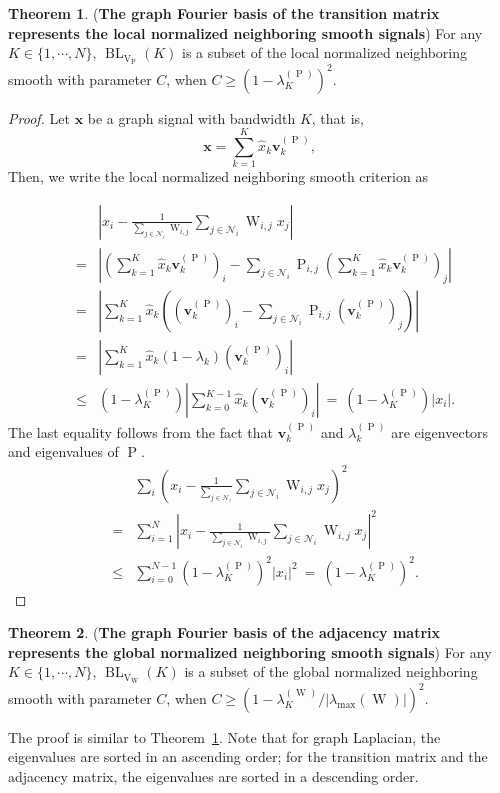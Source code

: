 \documentclass[journal,twocolumn,10pt]{IEEEtran}
\theoremstyle{definition}
\newtheorem{myThm}{Theorem}
\def\x{\mathbf{x}}
\def\vv{\mathbf{v}}
\DeclareMathOperator{\BL}{BL}
\DeclareMathOperator{\Pj}{P}
\DeclareMathOperator{\Vm}{V}
\DeclareMathOperator{\W}{W}
\begin{document}
\begin{myThm}({\bf The graph Fourier basis of the transition matrix represents the local normalized neighboring smooth signals})
\label{thm:LNNS}
For any $K \in \{1, \cdots, N \}$, $\BL_{\Vm_{\Pj}}(K)$ is a subset of the local normalized neighboring smooth with parameter $C$, when $C \geq  (1 - \lambda^{(\Pj)}_{K})^2$.
\end{myThm}
\begin{proof}
Let $\x$ be a graph signal with bandwidth $K$, that is,
$$
\x = \sum_{k=1}^{K} \widehat{x}_k \vv^{(\Pj)}_k,
$$
Then, we write the local normalized neighboring smooth criterion as

\begin{eqnarray*}
&& \left| x_i - \frac{1}{\sum_{j \in \mathcal{N}_i} \W_{i,j} }  \sum_{j \in \mathcal{N}_i} \W_{i,j} x_j  \right|
\\
&= &   \left| \left(\sum_{k=1}^{K} \widehat{x}_k \vv^{(\Pj)}_k \right)_i - \sum_{j  \in \mathcal{N}_i} \Pj_{i,j} \left(\sum_{k=1}^{K} \widehat{x}_k \vv^{(\Pj)}_k \right)_j \right|
\\
& = &   \left| \sum_{k=1}^{K} \widehat{x}_k \left(  (\vv^{(\Pj)}_k)_i - \sum_{j \in \mathcal{N}_i} \Pj_{i,j} (\vv^{(\Pj)}_k)_j \right) \right|
\\
& = &   \left| \sum_{k=1}^{K} \widehat{x}_k  (1 - \lambda_k)  (\vv^{(\Pj)}_k)_i \right|
\\
& \leq &  (1 - \lambda^{(\Pj)}_{K})  \left| \sum_{k=0}^{K-1} \widehat{x}_k  (\vv^{(\Pj)}_k)_i  \right| \ = \  (1 - \lambda^{(\Pj)}_{K})  |x_i|.
\end{eqnarray*}
The last equality follows from the fact that $\vv^{(\Pj)}_k$ and $\lambda^{(\Pj)}_k$ are eigenvectors and eigenvalues of $\Pj$.
\begin{eqnarray*}
&& \sum_i \left(  x_i -  \frac{1}{\sum_{j  \in \mathcal{N}_i }}  \sum_{j  \in \mathcal{N}_i } \W_{i,j} x_j  \right)^2 
\\
& = & \sum_{i=1}^{N} |x_i - \frac{1}{\sum_{j \in \mathcal{N}_i} \W_{i,j} }  \sum_{j \in \mathcal{N}_i} \W_{i,j} x_j |^2
\\
& \leq & \sum_{i=0}^{N-1}   (1 - \lambda^{(\Pj)}_{K} )^2  |x_i|^2 \ = \   (1 - \lambda^{(\Pj)}_{K})^2 .
\end{eqnarray*}
\end{proof}

\begin{myThm} ({\bf The graph Fourier basis of the adjacency matrix represents the global normalized neighboring smooth signals})
\label{thm:GNNS}
For any $K \in \{1, \cdots, N \}$, $\BL_{\Vm_{\W}}(K)$ is a subset of the global normalized neighboring smooth with parameter $C$, when $C \geq  (1 - \lambda^{(\W)}_{K} / |\lambda_{\max}{(\W)}| )^2$.
\end{myThm}
The proof is similar to Theorem~\ref{thm:LNNS}. Note that for graph Laplacian, the eigenvalues are sorted in an ascending order; for the transition matrix and the adjacency matrix, the eigenvalues are sorted in a descending order.
\end{document}
